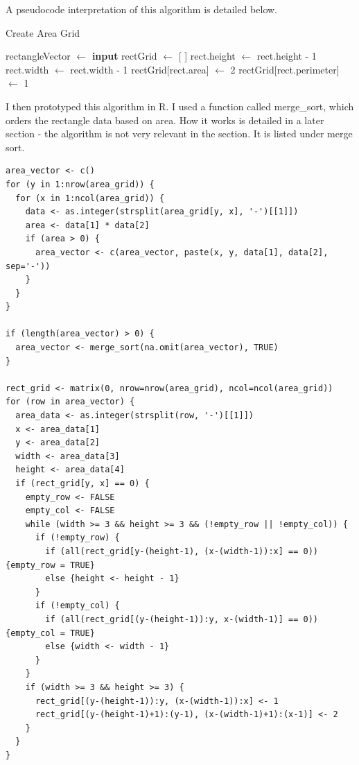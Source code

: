 \documentclass[titlepage]{article}
\begin{document}
A pseudocode interpretation of this algorithm is detailed below.

\begin{algorithm}[H]
\caption{Create Area Grid}
\begin{algorithmic}[1]
    	\State rectangleVector $\gets$ \textbf{input}
    	\State rectGrid $\gets$ [ ]
				\State rect.height $\gets$ rect.height - 1
			\EndWhile
				\State rect.width $\gets$ rect.width - 1
			\EndWhile
			rectGrid[rect.area] $\gets$ 2
			rectGrid[rect.perimeter] $\gets$ 1
		\EndIf
        \EndFor
\end{algorithmic}
\end{algorithm}

I then prototyped this algorithm in R. I used a function called merge\_sort, which orders the rectangle data based on area. How it works is detailed in a later section - the algorithm is not very relevant in the section. It is listed under merge sort. 

\begin{changemargin}{-1in}{-1in} 
\begin{verbatim}
area_vector <- c()
for (y in 1:nrow(area_grid)) {
  for (x in 1:ncol(area_grid)) {
    data <- as.integer(strsplit(area_grid[y, x], '-')[[1]])
    area <- data[1] * data[2]
    if (area > 0) {
      area_vector <- c(area_vector, paste(x, y, data[1], data[2], sep='-'))
    }
  }
}

if (length(area_vector) > 0) {
  area_vector <- merge_sort(na.omit(area_vector), TRUE)
}

rect_grid <- matrix(0, nrow=nrow(area_grid), ncol=ncol(area_grid))
for (row in area_vector) {
  area_data <- as.integer(strsplit(row, '-')[[1]])
  x <- area_data[1]
  y <- area_data[2]
  width <- area_data[3]
  height <- area_data[4]
  if (rect_grid[y, x] == 0) {
    empty_row <- FALSE
    empty_col <- FALSE
    while (width >= 3 && height >= 3 && (!empty_row || !empty_col)) {
      if (!empty_row) {
        if (all(rect_grid[y-(height-1), (x-(width-1)):x] == 0)) {empty_row = TRUE}
        else {height <- height - 1}
      }
      if (!empty_col) {
        if (all(rect_grid[(y-(height-1)):y, x-(width-1)] == 0)) {empty_col = TRUE}
        else {width <- width - 1}
      }
    }
    if (width >= 3 && height >= 3) {
      rect_grid[(y-(height-1)):y, (x-(width-1)):x] <- 1
      rect_grid[(y-(height-1)+1):(y-1), (x-(width-1)+1):(x-1)] <- 2
    }
  }
}
\end{verbatim}
\end{changemargin} 
\end{document}
